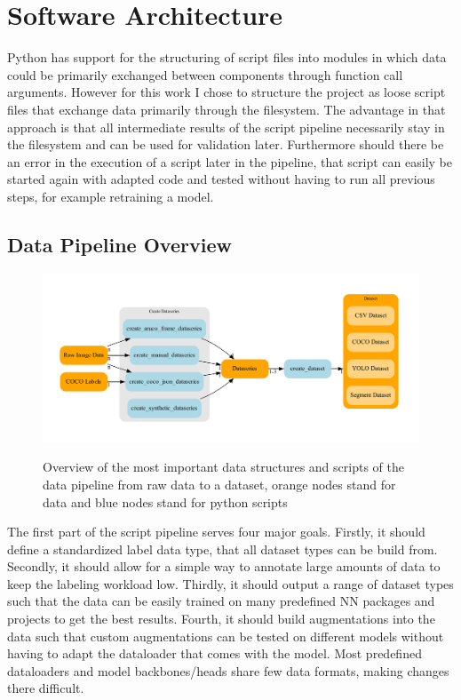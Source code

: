 \documentclass[10pt]{book}
\begin{document}
\section{Software Architecture}

Python has support for the structuring of script files into modules in which data could be primarily exchanged between components through function call arguments. However for this work I chose to structure the project as loose script files that exchange data primarily through the filesystem. The advantage in that approach is that all intermediate results of the script pipeline necessarily stay in the filesystem and can be used for validation later. Furthermore should there be an error in the execution of a script later in the pipeline, that script can easily be started again with adapted code and tested without having to run all previous steps, for example retraining a model.

\subsection{Data Pipeline Overview}

\begin{figure}
  \caption{Overview of the most important data structures and scripts of the data pipeline from raw data to a dataset, orange nodes stand for data and blue nodes stand for python scripts}
  \includegraphics[width=\textwidth]{graph/arch_data}
  \label{fig:arch_data}
\end{figure}

The first part of the script pipeline serves four major goals. Firstly, it should define a standardized label data type, that all dataset types can be build from. Secondly, it should allow for a simple way to annotate large amounts of data to keep the labeling workload low. Thirdly, it should output a range of dataset types such that the data can be easily trained on many predefined \ac{NN} packages and projects to get the best results. Fourth, it should build augmentations into the data such that custom augmentations can be tested on different models without having to adapt the dataloader that comes with the model. Most predefined dataloaders and model backbones/heads share few data formats, making changes there difficult.
\end{document}
